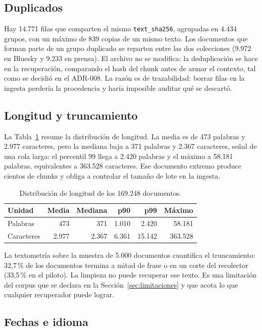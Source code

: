 \documentclass[11pt]{tg_usta}
\begin{document}
\subsection{Duplicados}

Hay 14.771 filas que comparten el mismo \texttt{text\_sha256}, agrupadas en 4.434 grupos, con un máximo de 839 copias de un mismo texto. Los documentos que forman parte de un grupo duplicado se reparten entre las dos colecciones (9.972 en Bluesky y 9.233 en prensa). El archivo no se modifica: la deduplicación se hace en la recuperación, comparando el hash del chunk antes de armar el contexto, tal como se decidió en el ADR-008. La razón es de trazabilidad: borrar filas en la ingesta perdería la procedencia y haría imposible auditar qué se descartó.

\subsection{Longitud y truncamiento}

La Tabla~\ref{tab:longitud} resume la distribución de longitud. La media es de 473 palabras y 2.977 caracteres, pero la mediana baja a 371 palabras y 2.367 caracteres, señal de una cola larga: el percentil 99 llega a 2.420 palabras y el máximo a 58.181 palabras, equivalentes a 363.528 caracteres. Ese documento extremo produce cientos de chunks y obliga a controlar el tamaño de lote en la ingesta.

\begin{table}[htbp]
\centering
\small
\begin{tabular}{lrrrrr}
\toprule
Unidad & Media & Mediana & p90 & p99 & Máximo \\
\midrule
Palabras & 473 & 371 & 1.010 & 2.420 & 58.181 \\
Caracteres & 2.977 & 2.367 & 6.361 & 15.142 & 363.528 \\
\bottomrule
\end{tabular}
\caption{Distribución de longitud de los 169.248 documentos.}
\label{tab:longitud}
\end{table}

La textometría sobre la muestra de 5.000 documentos cuantifica el truncamiento: 32,7\,\% de los documentos termina a mitad de frase o en un corte del recolector (33,5\,\% en el piloto). La limpieza no puede recuperar ese texto. Es una limitación del corpus que se declara en la Sección~\ref{sec:limitaciones} y que acota lo que cualquier recuperador puede lograr.

\subsection{Fechas e idioma}
\end{document}
